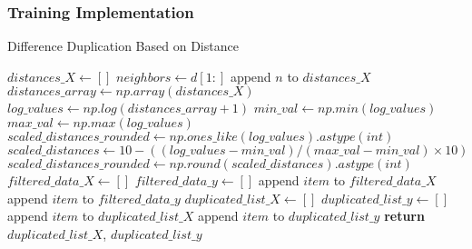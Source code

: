 \documentclass[a4paper, 12pt]{report}
\begin{document}
\subsubsection{Training Implementation}
\begin{algorithm}[H]
    \caption{Difference Duplication Based on Distance}
    \label{alg:duplication_Implementation_based_on_distance_train}
    \begin{algorithmic}[1]
            \State $distances\_X \gets []$
                \State $neighbors \gets d[1:]$
                    \State append $n$ to $distances\_X$
                \EndFor
            \EndFor
            \State $distances\_array \gets np.array(distances\_X)$
            \State $log\_values \gets np.log(distances\_array + 1)$
            \State $min\_val \gets np.min(log\_values)$
            \State $max\_val \gets np.max(log\_values)$
                \State $scaled\_distances\_rounded \gets np.ones\_like(log\_values).astype(int)$
            \Else
                \State $scaled\_distances \gets 10 - ((log\_values - min\_val) / (max\_val - min\_val) \times 10)$
                \State $scaled\_distances\_rounded \gets np.round(scaled\_distances).astype(int)$
            \EndIf
            \State $filtered\_data\_X \gets []$
            \State $filtered\_data\_y \gets []$
                    \State append $item$ to $filtered\_data\_X$
                \EndIf
            \EndFor
                    \State append $item$ to $filtered\_data\_y$
                \EndIf
            \EndFor
            \State $duplicated\_list\_X \gets []$
            \State $duplicated\_list\_y \gets []$
                    \State append $item$ to $duplicated\_list\_X$
                \EndFor
            \EndFor
                    \State append $item$ to $duplicated\_list\_y$
                \EndFor
            \EndFor
            \State \textbf{return} $duplicated\_list\_X$, $duplicated\_list\_y$
        \EndFunction
    \end{algorithmic}
\end{algorithm}
\end{document}

